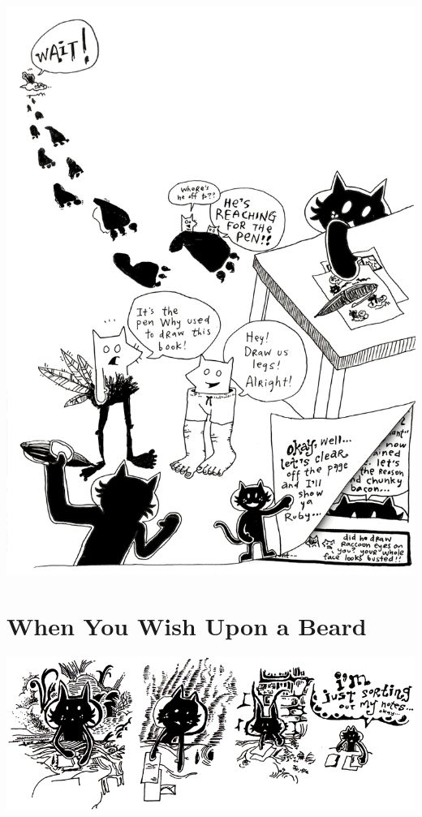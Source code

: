 \documentclass[10pt,twoside]{report}
\begin{document}
	\includegraphics[width=1.0\textwidth]{cache/80.png}
\newpage
\thispagestyle{empty}
\mbox{}
\cleartooddpage


\chapter{When You Wish Upon a Beard}

\vfill

\includegraphics[width=1.0\textwidth]{cache/81.png}
\end{document}
